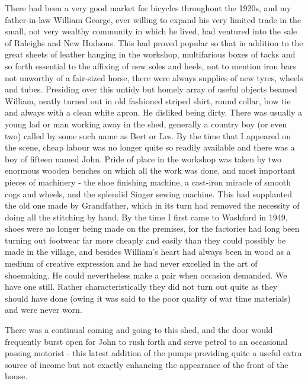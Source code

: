 There had been a very good market for bicycles throughout the 1920s, and my father-in-law William George, ever willing to expand his very limited trade in the small, not very wealthy community in which he lived, had ventured into the sale of Raleighs and New Hudsons. This had proved popular so that in addition to the great sheets of leather hanging in the workshop, multifarious boxes of tacks and so forth essential to the affixing of new soles and heels, not to mention iron bars not unworthy of a fair-sized horse, there were always supplies of new tyres, wheels and tubes. Presiding over this untidy but homely array of useful objects beamed William, neatly turned out in old fashioned striped shirt, round collar, bow tie and always with a clean white apron. He disliked being dirty. There was usually a young lad or man working away in the shed, generally a country boy (or even two) called by some such name as Bert or Les. By the time that I appeared on the scene, cheap labour was no longer quite so readily available and there was a boy of fifteen named John. Pride of place in the workshop was taken by two enormous wooden benches on which all the work was done, and most important pieces of machinery - the shoe finishing machine, a cast-iron miracle of smooth cogs and wheels, and the splendid Singer sewing machine. This had supplanted the old one made by Grandfather, which in its turn had removed the necessity of doing all the stitching by hand. By the time I first came to Washford in 1949, shoes were no longer being made on the premises, for the factories had long been turning out footwear far more cheaply and easily than they could possibly be made in the village, and besides William's heart had always been in wood as a medium of creative expression and he had never excelled in the art of shoemaking. He could nevertheless make a pair when occasion demanded. We have one still. Rather characteristically they did not turn out quite as they should have done (owing it was said to the poor quality of war time materials) and were never worn.

There was a continual coming and going to this shed, and the door would frequently burst open for John to rush forth and serve petrol to an occasional passing motorist - this latest addition of the pumps providing quite a useful extra source of income but not exactly enhancing the appearance of the front of the house.

